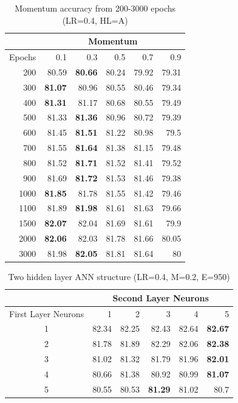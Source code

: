\documentclass[12pt]{article}
\begin{document}
\begin{table}[htbp]
  \centering
  \caption{Momentum accuracy from 200-3000 epochs (LR=0.4, HL=A)}
    \begin{tabular}{r|rrrrr}
    \toprule
          & \multicolumn{5}{c}{Momentum} \\
    \midrule
    \multicolumn{1}{l|}{Epochs} & 0.1   & 0.3   & 0.5   & 0.7   & 0.9 \\
    \midrule
    200   & 80.59 & \textbf{80.66} & 80.24 & 79.92 & 79.31 \\
    300   & \textbf{81.07} & 80.96 & 80.55 & 80.46 & 79.34 \\
    400   & \textbf{81.31} & 81.17 & 80.68 & 80.55 & 79.49 \\
    500   & 81.33 & \textbf{81.36} & 80.96 & 80.72 & 79.39 \\
    600   & 81.45 & \textbf{81.51} & 81.22 & 80.98 & 79.5 \\
    700   & 81.55 & \textbf{81.64} & 81.38 & 81.15 & 79.48 \\
    800   & 81.52 & \textbf{81.71} & 81.52 & 81.41 & 79.52 \\
    900   & 81.69 & \textbf{81.72} & 81.53 & 81.46 & 79.38 \\
    1000  & \textbf{81.85} & 81.78 & 81.55 & 81.42 & 79.46 \\
    1100  & 81.89 & \textbf{81.98} & 81.61 & 81.63 & 79.66 \\
    1500  & \textbf{82.07} & 82.04 & 81.69 & 81.61 & 79.9 \\
    2000  & \textbf{82.06} & 82.03 & 81.78 & 81.66 & 80.05 \\
    3000  & 81.98 & \textbf{82.05} & 81.81 & 81.64 & 80 \\
    \bottomrule
    \end{tabular}%
  \label{tab:addlabel}%
\end{table}%



\begin{table}[htbp]
  \centering
  \caption{Two hidden layer ANN structure (LR=0.4, M=0.2, E=950)}
    \begin{tabular}{c|rrrrr}
      \toprule
        & \multicolumn{5}{c}{Second Layer Neurons} \\
      \midrule
        \multicolumn{1}{c|}{First Layer Neurons} & 1     & 2     & 3     & 4     & 5 \\
      \midrule
        1 & 82.34 & 82.25 & 82.43 & 82.64 & \textbf{82.67} \\
        2 & 81.78 & 81.89 & 82.29 & 82.06 & \textbf{82.38} \\
        3 & 81.02 & 81.32 & 81.79 & 81.96 & \textbf{82.01} \\
        4 & 80.66 & 81.38 & 80.92 & 80.99 & \textbf{81.07} \\
        5 & 80.55 & 80.53 & \textbf{81.29} & 81.02 & 80.7 \\
      \bottomrule
    \end{tabular}%
  \label{tab:addlabel}%
\end{table}%
\end{document}
